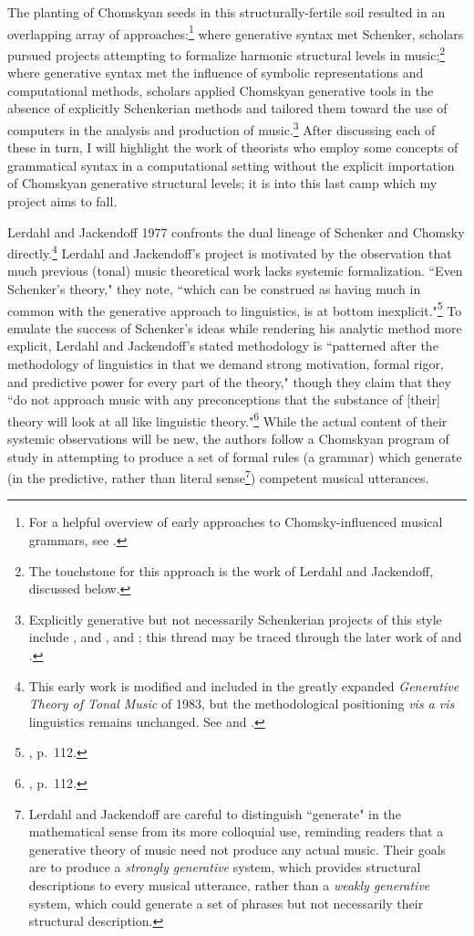 The planting of Chomskyan seeds in this structurally-fertile soil resulted in an overlapping array of approaches:\footnote{For a helpful overview of early approaches to Chomsky-influenced musical grammars, see \cite{roads1979}.}  where generative syntax met Schenker, scholars pursued projects attempting to formalize harmonic structural levels in music;\footnote{The touchstone for this approach is the work of Lerdahl and Jackendoff, discussed below.} where generative syntax met the influence of symbolic representations and computational methods, scholars applied Chomskyan generative tools in the absence of explicitly Schenkerian methods and tailored them toward the use of computers in the analysis and production of music.\footnote{Explicitly generative but not necessarily Schenkerian projects of this style include \cite{winograd1968}, \cite{laske1972} and \cite{laske1975}, and \cite{steedman1984}; this thread may be traced through the later work of \cite{keller2007} and \cite{rohrmeier2011}.}  After discussing each of these in turn, I will highlight the work of theorists who employ some concepts of grammatical syntax in a computational setting without the explicit importation of Chomskyan generative structural levels; it is into this last camp which my project aims to fall.

Lerdahl and Jackendoff 1977 confronts the dual lineage of Schenker and Chomsky directly.\footnote{This early work is modified and included in the greatly expanded \emph{Generative Theory of Tonal Music} of 1983, but the methodological positioning \emph{vis a vis} linguistics remains unchanged.  See \cite{lj1977} and \cite{lj1983}.}  Lerdahl and Jackendoff's project is motivated by the observation that much previous (tonal) music theoretical work lacks systemic formalization.  ``Even Schenker's theory," they note, ``which can be construed as having much in common with the generative approach to linguistics, is at bottom inexplicit."\footnote{\cite{lj1977}, p.\ 112.}  To emulate the success of Schenker's ideas while rendering his analytic method more explicit, Lerdahl and Jackendoff's stated methodology is ``patterned after the methodology of linguistics in that we demand strong motivation, formal rigor, and predictive power for every part of the theory," though they claim that they ``do not approach music with any preconceptions that the substance of [their] theory will look at all like linguistic theory."\footnote{\cite{lj1977}, p.\ 112.}  While the actual content of their systemic observations will be new, the authors follow a Chomskyan program of study in attempting to produce a set of formal rules (a grammar) which generate (in the predictive, rather than literal sense\footnote{Lerdahl and Jackendoff are careful to distinguish ``generate" in the mathematical sense from its more colloquial use, reminding readers that a generative theory of music need not produce any actual music.  Their goals are to produce a \emph{strongly generative} system, which provides structural descriptions to every musical utterance, rather than a \emph{weakly generative} system, which could generate a set of phrases but not necessarily their structural description.}) competent musical utterances.

